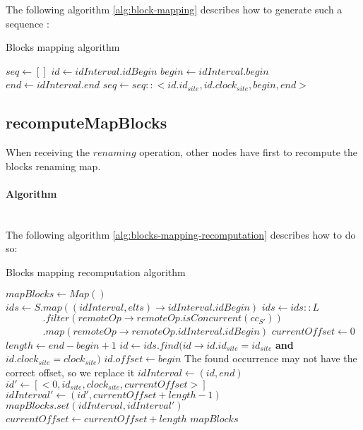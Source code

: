 \documentclass[a4paper]{article}
\begin{document}
The following algorithm \ref{alg:block-mapping} describes how to generate such a
sequence :

\begin{algorithm}
  \caption{Blocks mapping algorithm}
  \label{alg:block-mapping}
  \begin{algorithmic}
      \State $seq \gets []$
        \State $id \gets idInterval.idBegin$
        \State $begin \gets idInterval.begin$
        \State $end \gets idInterval.end$
        \State $seq \gets seq :: <id.id_{site}, id.clock_{site}, begin, end>$
      \EndFor
    \EndFunction
  \end{algorithmic}
\end{algorithm}

\subsection{recomputeMapBlocks}

When receiving the $renaming$ operation, other nodes have first to recompute
the blocks renaming map.

\paragraph{Algorithm}~\\

The following algorithm \ref{alg:blocks-mapping-recomputation} describes how to do so:

\begin{algorithm}
  \caption{Blocks mapping recomputation algorithm}
  \label{alg:blocks-mapping-recomputation}
  \begin{algorithmic}
      \State $mapBlocks \gets Map()$
      \State $ids \gets S.map((idInterval, elts) \to idInterval.idBegin)$
      \State $ids \gets ids :: L$
      \State $~~~~~~~~~~~~~~~~~.filter(remoteOp \to remoteOp.isConcurrent(cc_{S'}))$
      \State $~~~~~~~~~~~~~~~~~.map(remoteOp \to remoteOp.idInterval.idBegin)$
      \State $currentOffset \gets 0$
        \State $length \gets end - begin + 1$
        \State $id \gets ids.find(id \to id.id_{site} = id_{site}$ \textbf{and} $id.clock_{site} = clock_{site})$
        \State $id.offset \gets begin$
        \Comment The found occurrence may not have the correct offset, so we replace it
        \State $idInterval \gets (id, end)$
        \State $id' \gets [<0, id_{site}, clock_{site}, currentOffset>]$
        \State $idInterval' \gets (id', currentOffset + length - 1)$
        \State $mapBlocks.set(idInterval, idInterval')$
        \State $currentOffset \gets currentOffset + length$
      \EndFor
      \State \Return $mapBlocks$
    \EndFunction
  \end{algorithmic}
\end{algorithm}
\end{document}
